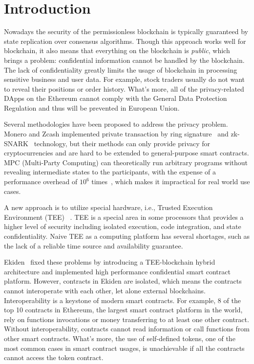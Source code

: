 \section{Introduction}

Nowadays the security of the permissionless blockchain is typically guaranteed by state replication over consensus algorithms. Though this approach works well for blockchain, it also means that everything on the blockchain is \textit{public}, which brings a problem: confidential information cannot be handled by the blockchain. The lack of confidentiality greatly limits the usage of blockchain in processing sensitive business and user data. For example, stock traders usually do not want to reveal their positions or order history.
What's more, all of the privacy-related DApps on the Ethereum cannot comply with the General Data Protection Regulation and thus will be prevented in European Union.

Several methodologies have been proposed to address the privacy problem. Monero and Zcash implemented private transaction by ring signature~\cite{van2013cryptonote} and zk-SNARK~\cite{sasson2014zerocash} technology, but their methods can only provide privacy for cryptocurrencies and are hard to be extended to general-purpose smart contracts. MPC (Multi-Party Computing) can theoretically run arbitrary programs without revealing intermediate states to the participants, with the expense of a performance overhead of $10^6$ times~\cite{cheng2019ekiden}, which makes it impractical for real world use cases.

A new approach is to utilize special hardware, i.e., Trusted Execution Environment (TEE)~\cite{teewiki} . TEE is a special area in some processors that provides a higher level of security including isolated execution, code integration, and state confidentiality. Naive TEE as a computing platform has several shortages, such as the lack of a reliable time source and availability guarantee.

Ekiden~\cite{cheng2019ekiden} fixed these problems by introducing a TEE-blockchain hybrid architecture and implemented high performance confidential smart contract platform. However, contracts in Ekiden are isolated, which means the contracts cannot interoperate with each other, let alone external blockchains. Interoperability is a keystone of modern smart contracts. For example, 8 of the top 10 contracts in Ethereum, the largest smart contract platform in the world, rely on functions invocations or money transferring to at least one other contract. Without interoperability, contracts cannot read information or call functions from other smart contracts. What's more, the use of self-defined tokens, one of the most common cases in smart contract usages, is unachievable if all the contracts cannot access the token contract.

